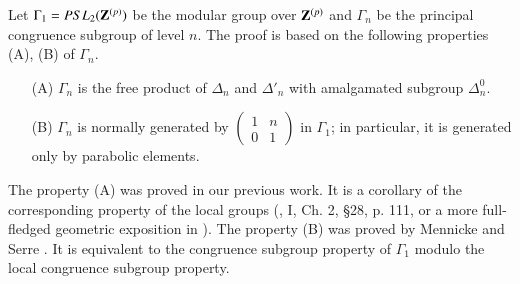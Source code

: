 Let $\Gamma_1 = PSL_2 (\mathbf{Z}^{(p)})$ be the modular group over $\mathbf{Z}^{(p)}$ and $\Gamma_n$ be the principal congruence subgroup of level $n$. The proof is based on the following properties (A), (B) of $\Gamma_n$.
\begin{itemize}
\item[(A)] $\Gamma_n$ is the free product of $\Delta_n$ and $\Delta'_n$ with  amalgamated subgroup $\Delta^0_n$.

\item[(B)] $\Gamma_n$ is normally generated by $\begin{pmatrix}
1 & n \\0 & 1\end{pmatrix}$ in $\Gamma_1$;  in particular, it is generated only by parabolic elements.
\end{itemize}

The property (A) was proved in our previous work. It is a corollary of the corresponding property of the local groups (\cite{art6-key8}, I, Ch. 2, \S 28, p. 111, or a more full-fledged geometric exposition in \cite{art6-key15}). The property (B) was proved by Mennicke \cite{art6-key12} and Serre \cite{art6-key16}. It is equivalent to the congruence subgroup property of $\Gamma_1$ modulo the local congruence subgroup property.

